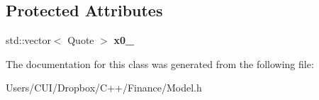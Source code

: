 \subsection*{Protected Attributes}
\begin{DoxyCompactItemize}
\item 
\hypertarget{class_model_aea7cb62b50849b8c9beef1493435241e}{}\label{class_model_aea7cb62b50849b8c9beef1493435241e} 
std\+::vector$<$ Quote $>$ {\bfseries x0\+\_\+}
\end{DoxyCompactItemize}


The documentation for this class was generated from the following file\+:\begin{DoxyCompactItemize}
\item 
Users/\+C\+U\+I/\+Dropbox/\+C++/\+Finance/Model.\+h\end{DoxyCompactItemize}
